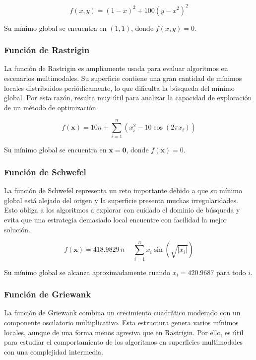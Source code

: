 \documentclass[
  12pt,
  letterpaper,
  DIV=11,
  numbers=noendperiod]{scrartcl}
\begin{document}
\[
f(x, y) = (1 - x)^2 + 100(y - x^2)^2
\]

Su mínimo global se encuentra en \((1,1)\), donde \(f(x,y)=0\).

\subsubsection{Función de Rastrigin}\label{funciuxf3n-de-rastrigin}

La función de Rastrigin es ampliamente usada para evaluar algoritmos en
escenarios multimodales. Su superficie contiene una gran cantidad de
mínimos locales distribuidos periódicamente, lo que dificulta la
búsqueda del mínimo global. Por esta razón, resulta muy útil para
analizar la capacidad de exploración de un método de optimización.

\[
f(\mathbf{x}) = 10n + \sum_{i=1}^{n} \left(x_i^2 - 10 \cos(2\pi x_i)\right)
\]

Su mínimo global se encuentra en \(\mathbf{x}=\mathbf{0}\), donde
\(f(\mathbf{x})=0\).

\subsubsection{Función de Schwefel}\label{funciuxf3n-de-schwefel}

La función de Schwefel representa un reto importante debido a que su
mínimo global está alejado del origen y la superficie presenta muchas
irregularidades. Esto obliga a los algoritmos a explorar con cuidado el
dominio de búsqueda y evita que una estrategia demasiado local encuentre
con facilidad la mejor solución.

\[
f(\mathbf{x}) = 418.9829\,n - \sum_{i=1}^{n} x_i \sin\left(\sqrt{|x_i|}\right)
\]

Su mínimo global se alcanza aproximadamente cuando \(x_i = 420.9687\)
para todo \(i\).

\subsubsection{Función de Griewank}\label{funciuxf3n-de-griewank}

La función de Griewank combina un crecimiento cuadrático moderado con un
componente oscilatorio multiplicativo. Esta estructura genera varios
mínimos locales, aunque de una forma menos agresiva que en Rastrigin.
Por ello, es útil para estudiar el comportamiento de los algoritmos en
superficies multimodales con una complejidad intermedia.
\end{document}

